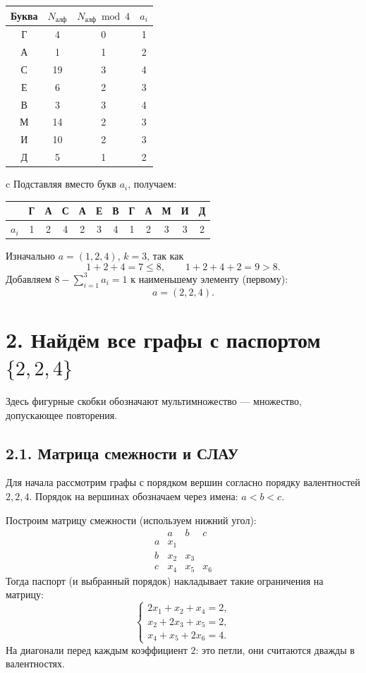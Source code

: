 \documentclass[12pt,a4paper]{article}
\begin{document}
\begin{center}
\begin{tabular}{cccc}
\toprule
Буква & $N_{\text{алф}}$ & $N_{\text{алф}}\bmod 4$ & $a_i$\\
\midrule
Г & 4 & 0 & 1\\ А & 1 & 1 & 2\\ С & 19 & 3 & 4\\
Е & 6 & 2 & 3\\ В & 3 & 3 & 4\\ М & 14 & 2 & 3\\
И & 10 & 2 & 3\\ Д & 5 & 1 & 2\\
\bottomrule
\end{tabular}
\qquad
\begin{tabular}{c}
Подставляя вместо букв $a_i$, получаем:\\[6pt]
\begin{tabular}{c|ccccccccccc}
 & Г & А & С & А & Е & В & Г & А & М & И & Д\\
\hline
$a_i$ & 1 & 2 & 4 & 2 & 3 & 4 & 1 & 2 & 3 & 3 & 2
\end{tabular}
\end{tabular}
\end{center}
Изначально $a=(1,2,4)$, $k=3$, так как
\[
  1+2+4=7\leq 8,\qquad 1+2+4+2=9>8.
\]
Добавляем $8-\sum_{i=1}^{3}a_i=1$ к наименьшему элементу (первому):
\[
  \boxed{a=(2,2,4).}
\]

\newpage
\section*{2. Найдём все графы с паспортом $\{2,2,4\}$}
Здесь фигурные скобки обозначают мультимножество --- множество,
допускающее повторения.

\subsection*{2.1. Матрица смежности и СЛАУ}
Для начала рассмотрим графы с порядком вершин согласно порядку валентностей
$2,2,4$. Порядок на вершинах обозначаем через имена: $a<b<c$.

Построим матрицу смежности (используем нижний угол):
\[
\begin{array}{c|ccc}
 & a & b & c\\\hline
a & x_1 & & \\
b & x_2 & x_3 & \\
c & x_4 & x_5 & x_6
\end{array}
\]
Тогда паспорт (и выбранный порядок) накладывает такие ограничения на матрицу:
\[
\begin{cases}
2x_1+x_2+x_4=2,\\
x_2+2x_3+x_5=2,\\
x_4+x_5+2x_6=4.
\end{cases}
\]
На диагонали перед каждым коэффициент $2$: это петли, они считаются дважды
в валентностях.
\end{document}
